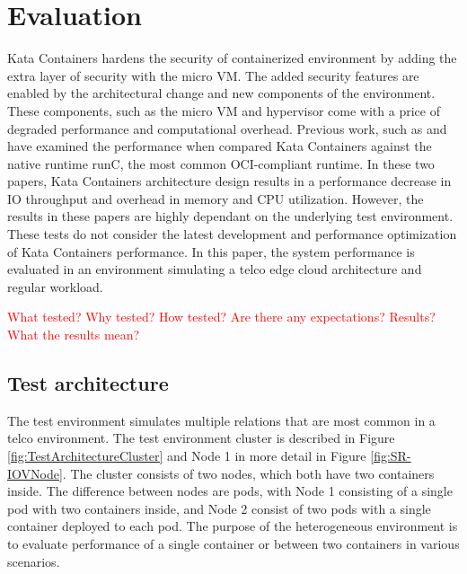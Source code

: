 \chapter{Evaluation}
\label{chapter:evaluation}

Kata Containers hardens the security of containerized environment by adding the extra layer of security with the micro VM. The added security features are enabled by the architectural change and new components of the environment. These components, such as the micro VM and hypervisor come with a price of degraded performance and computational overhead. Previous work, such as \cite{EverartsdeVelp2020} and \cite{Kumar2020} have examined the performance when compared Kata Containers against the native runtime runC, the most common OCI-compliant runtime. In these two papers, Kata Containers architecture design results in a performance decrease in IO throughput and overhead in memory and CPU utilization. However, the results in these papers are highly dependant on the underlying test environment. These tests do not consider the latest development and performance optimization of Kata Containers performance. In this paper, the system performance is evaluated in an environment simulating a telco edge cloud architecture and regular workload.

\textcolor{red}{What tested?}
\textcolor{red}{Why tested?}
\textcolor{red}{How tested?}
\textcolor{red}{Are there any expectations?}
\textcolor{red}{Results?}
\textcolor{red}{What the results mean?}

\section{Test architecture}
\label{section:test_architecture}

The test environment simulates multiple relations that are most common in a telco environment. The test environment cluster is described in Figure \ref{fig:TestArchitectureCluster} and Node 1 in more detail in Figure \ref{fig:SR-IOVNode}. The cluster consists of two nodes, which both have two containers inside. The difference between nodes are pods, with Node 1 consisting of a single pod with two containers inside, and Node 2 consist of two pods with a single container deployed to each pod. The purpose of the heterogeneous environment is to evaluate performance of a single container or between two containers in various scenarios.

